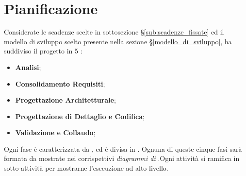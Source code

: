 \section{Pianificazione}
\label{pianificazione}
Considerate le scadenze scelte in sottosezione \S\ref{sub:scadenze_fissate} ed il modello di sviluppo scelto presente nella sezione \S\ref{modello_di_sviluppo}, {\Gruppo} ha suddiviso il progetto in 5 :
\begin{itemize}
    \item \textbf{Analisi};
    \item \textbf{Consolidamento Requisiti};
    \item \textbf{Progettazione Architetturale};
    \item \textbf{Progettazione di Dettaglio e Codifica};
    \item \textbf{Validazione e Collaudo};
\end{itemize}
 Ogni fase è caratterizzata da ,  ed è divisa in . Ognuna di queste cinque fasi sarà formata da  mostrate nei corrispettivi \textit{diagrammi di }.Ogni attività si ramifica in sotto-attività per mostrarne l'esecuzione ad alto livello.


\newpage

\newpage

\newpage

\newpage

\newpage
